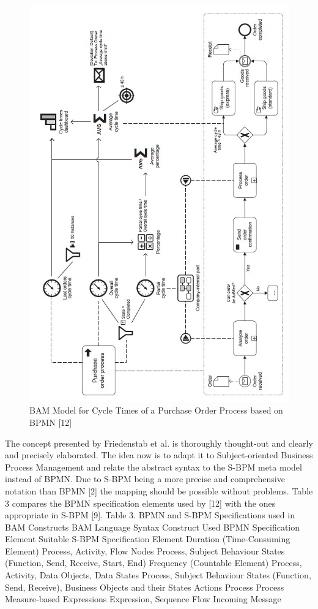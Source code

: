 \begin{figure}[h]
	\centering
	\includegraphics[width=0.9\linewidth]{Figures/Chapter5/Monitoring/BAM Model for Cycle Times.jpg}
	\caption[BAM Model for Cycle Times of a Purchase Order Process based on BPMN 12]{BAM Model for Cycle Times of a Purchase Order Process based on BPMN [12]}
	\label{fig:Model-Cycle-Times}
\end{figure}


The concept presented by Friedenstab et al. is thoroughly thought-out and clearly and precisely elaborated. The idea now is to adapt it to Subject-oriented Business Process Management and relate the abstract syntax to the S-BPM meta model instead of BPMN. Due to S-BPM being a more precise and comprehensive notation than BPMN [2] the mapping should be possible without problems. Table 3 compares the BPMN specification elements used by [12] with the ones appropriate in S-BPM [9].
Table 3.  BPMN and S-BPM Specifications used in BAM Constructs
BAM Language Syntax Construct	Used BPMN Specification Element 	Suitable S-BPM Specification Element 
Duration
(Time-Consuming Element)	Process, Activity, Flow Nodes	Process, Subject Behaviour States (Function, Send, Receive, Start, End)
Frequency
(Countable Element)	Process, Activity, Data Objects, Data States	Process, Subject Behaviour States (Function, Send, Receive), Business Objects and their States
Actions	Process	Process
Measure-based Expressions	Expression, Sequence Flow	Incoming Message

